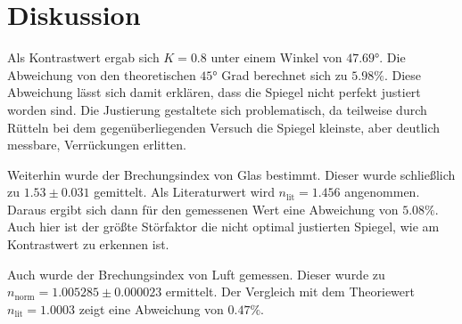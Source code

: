 \section{Diskussion}
\label{sec:Diskussion}
Als Kontrastwert ergab sich $K = 0.8$ unter einem Winkel von $47.69°$.
Die Abweichung von den theoretischen $45°$ Grad berechnet sich zu $5.98 \% $.
Diese Abweichung lässt sich damit erklären, dass die Spiegel nicht perfekt justiert worden sind.
Die Justierung gestaltete sich problematisch, da teilweise durch Rütteln bei dem gegenüberliegenden Versuch die Spiegel kleinste, aber deutlich messbare, Verrückungen erlitten.

Weiterhin wurde der Brechungsindex von Glas bestimmt.
Dieser wurde schließlich zu $1.53 \pm 0.031$ gemittelt.
Als Literaturwert wird $n_\text{lit} = 1.456$ angenommen.
Daraus ergibt sich dann für den gemessenen Wert eine Abweichung von $5.08 \%$.
Auch hier ist der größte Störfaktor die nicht optimal justierten Spiegel, wie am Kontrastwert zu erkennen ist.

Auch wurde der Brechungsindex von Luft gemessen.
Dieser wurde zu $n_{\text{norm}} = 1.005285 \pm 0.000023$ ermittelt.
Der Vergleich mit dem Theoriewert $n_\text{lit} = 1.0003$ zeigt eine Abweichung von $0.47\%$.